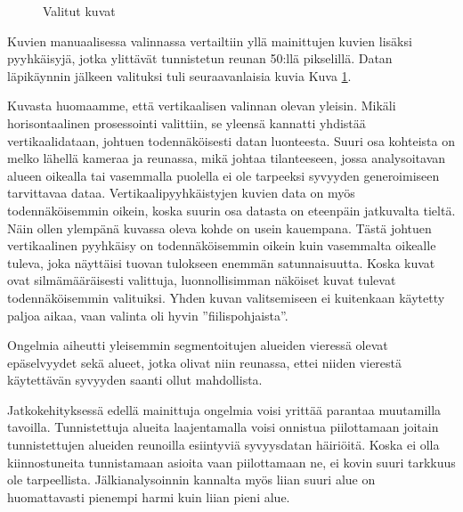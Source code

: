 \begin{figure}[h]
    \centering
    \caption{Valitut kuvat}
    \label{fig:selected}
\end{figure}


Kuvien manuaalisessa valinnassa vertailtiin yllä mainittujen kuvien lisäksi pyyhkäisyjä,
jotka ylittävät tunnistetun reunan 50:llä pikselillä.
Datan läpikäynnin jälkeen valituksi tuli seuraavanlaisia kuvia Kuva \ref{fig:selected}.


Kuvasta huomaamme, että vertikaalisen valinnan olevan yleisin.
Mikäli horisontaalinen prosessointi valittiin, se yleensä kannatti yhdistää vertikaalidataan, johtuen todennäköisesti datan luonteesta.
Suuri osa kohteista on melko lähellä kameraa ja reunassa, 
mikä johtaa tilanteeseen, jossa analysoitavan alueen oikealla tai vasemmalla puolella ei ole tarpeeksi syvyyden generoimiseen tarvittavaa dataa.
Vertikaalipyyhkäistyjen kuvien data on myös todennäköisemmin oikein, koska suurin osa datasta on eteenpäin jatkuvalta tieltä.
Näin ollen ylempänä kuvassa oleva kohde on usein kauempana.
Tästä johtuen vertikaalinen pyyhkäisy on todennäköisemmin oikein kuin vasemmalta oikealle tuleva, joka näyttäisi tuovan tulokseen enemmän satunnaisuutta.
Koska kuvat ovat silmämääräisesti valittuja, luonnollisimman näköiset kuvat tulevat todennäköisemmin valituiksi.
Yhden kuvan valitsemiseen ei kuitenkaan käytetty paljoa aikaa, vaan valinta oli hyvin ”fiilispohjaista”.

Ongelmia aiheutti yleisemmin segmentoitujen alueiden vieressä olevat epäselvyydet sekä alueet, jotka olivat niin reunassa, ettei niiden vierestä käytettävän syvyyden saanti ollut mahdollista.

Jatkokehityksessä edellä mainittuja ongelmia voisi yrittää parantaa muutamilla tavoilla. 
Tunnistettuja alueita laajentamalla voisi onnistua piilottamaan joitain tunnistettujen alueiden reunoilla esiintyviä syvyysdatan häiriöitä.
Koska ei olla kiinnostuneita tunnistamaan asioita vaan piilottamaan ne, ei kovin suuri tarkkuus ole tarpeellista.
Jälkianalysoinnin kannalta myös liian suuri alue on huomattavasti pienempi harmi kuin liian pieni alue.

